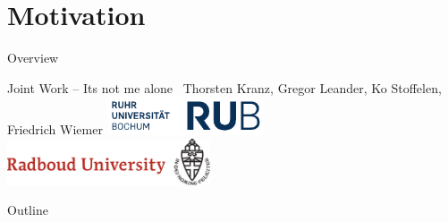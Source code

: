 \section{Motivation}
\begin{frame}{Overview}{}
    \begin{block}{Joint Work -- Its not me alone~\cite{ToSC:KLSW17}}
        \centering
        Thorsten Kranz, Gregor Leander, Ko Stoffelen, Friedrich Wiemer
        \includegraphics[width=0.35\textwidth]{data/logo_rub}
        \hspace{2em}
        \includegraphics[width=0.45\textwidth]{data/ru_en_branding}
    \end{block}
    \begin{block}{Outline}
        \vspace{0.5em}
        \tableofcontents
    \end{block}
\end{frame}

